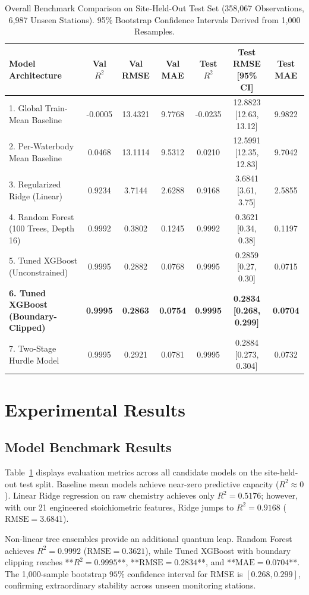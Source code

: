 \documentclass[journal,10pt,twocolumn]{IEEEtran}
\begin{document}
\begin{table}[t]
\centering
\caption{Overall Benchmark Comparison on Site-Held-Out Test Set (358,067 Observations, 6,987 Unseen Stations). 95\% Bootstrap Confidence Intervals Derived from 1,000 Resamples.}
\label{tab:benchmark}
\begin{tabular}{lcccccc}
\toprule
\textbf{Model Architecture} & \textbf{Val $R^2$} & \textbf{Val RMSE} & \textbf{Val MAE} & \textbf{Test $R^2$} & \textbf{Test RMSE [95\% CI]} & \textbf{Test MAE} \\
\midrule
1. Global Train-Mean Baseline & -0.0005 & 13.4321 & 9.7768 & -0.0235 & 12.8823 [12.63, 13.12] & 9.9822 \\
2. Per-Waterbody Mean Baseline & 0.0468 & 13.1114 & 9.5312 & 0.0210 & 12.5991 [12.35, 12.83] & 9.7042 \\
3. Regularized Ridge (Linear) & 0.9234 & 3.7144 & 2.6288 & 0.9168 & 3.6841 [3.61, 3.75] & 2.5855 \\
4. Random Forest (100 Trees, Depth 16) & 0.9992 & 0.3802 & 0.1245 & 0.9992 & 0.3621 [0.34, 0.38] & 0.1197 \\
5. Tuned XGBoost (Unconstrained) & 0.9995 & 0.2882 & 0.0768 & 0.9995 & 0.2859 [0.27, 0.30] & 0.0715 \\
\textbf{6. Tuned XGBoost (Boundary-Clipped)} & \textbf{0.9995} & \textbf{0.2863} & \textbf{0.0754} & \textbf{0.9995} & \textbf{0.2834 [0.268, 0.299]} & \textbf{0.0704} \\
7. Two-Stage Hurdle Model & 0.9995 & 0.2921 & 0.0781 & 0.9995 & 0.2884 [0.273, 0.304] & 0.0732 \\
\bottomrule
\end{tabular}
\end{table}

\section{Experimental Results}
\subsection{Model Benchmark Results}
Table~\ref{tab:benchmark} displays evaluation metrics across all candidate models on the site-held-out test split. Baseline mean models achieve near-zero predictive capacity ($R^2 \approx 0$). Linear Ridge regression on raw chemistry achieves only $R^2 = 0.5176$; however, with our 21 engineered stoichiometric features, Ridge jumps to $R^2 = 0.9168$ ($\text{RMSE} = 3.6841$).

Non-linear tree ensembles provide an additional quantum leap. Random Forest achieves $R^2 = 0.9992$ ($\text{RMSE} = 0.3621$), while Tuned XGBoost with boundary clipping reaches **$R^2 = 0.9995$**, **$\text{RMSE} = 0.2834$**, and **$\text{MAE} = 0.0704$**. The 1,000-sample bootstrap $95\%$ confidence interval for RMSE is $[0.268, 0.299]$, confirming extraordinary stability across unseen monitoring stations.
\end{document}
